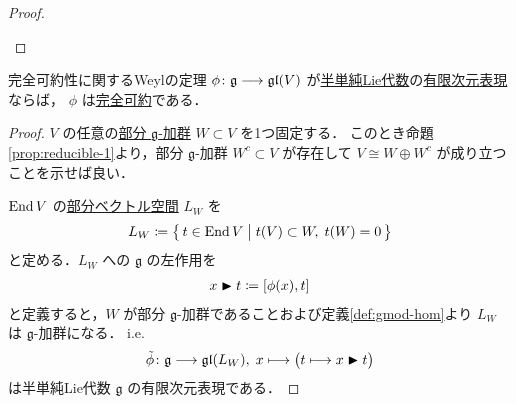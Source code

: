\documentclass[rep_main]{subfiles}
\begin{document}
\begin{proof}
\begin{description}
	\end{description}
	
\end{proof}


\begin{mytheo}[label=thm:Weyl]{完全可約性に関するWeylの定理}
	$\phi \colon \mathfrak{g} \longrightarrow \mathfrak{gl} (V)$ が\hyperref[def:semisimple-LieAlg]{半単純Lie代数}の\underline{有限次元}\hyperref[ax:g-module]{表現}ならば，
	$\mathfrak{\phi}$ は\hyperref[def:irr]{完全可約}である．
\end{mytheo}

\begin{proof}
	$V$ の任意の\hyperref[def:sub-g-module]{部分 $\mathfrak{g}$-加群} $W \subset V$ を1つ固定する．
	このとき命題\ref{prop:reducible-1}より，部分 $\mathfrak{g}$-加群 $W^c \subset V$ が存在して $V \cong W \oplus W^c$ が成り立つことを示せば良い．

	$\operatorname{End} V$ の\underline{部分ベクトル空間} $L_W$ を
	\begin{align}
		L_W \coloneqq \bigl\{\, t \in \operatorname{End} V \bigm| t(V) \subset W,\; t(W) = 0  \,\bigr\} 
	\end{align}
	と定める．$L_W$ への $\mathfrak{g}$ の左作用を
	\begin{align}
		x \btr t \coloneqq \comm{\phi(x)}{t}
	\end{align}
	と定義すると，$W$ が部分 $\mathfrak{g}$-加群であることおよび定義\ref{def:gmod-hom}より $L_W$ は $\mathfrak{g}$-加群になる．
	i.e. 
	\begin{align}
		\tilde{\phi} \colon \mathfrak{g} \longrightarrow \mathfrak{gl} (L_W),\; x \longmapsto \bigl( t \longmapsto x \blacktriangleright t \bigr) 
	\end{align}
	は半単純Lie代数 $\mathfrak{g}$ の有限次元表現である．
	

\end{proof}
\end{document}
